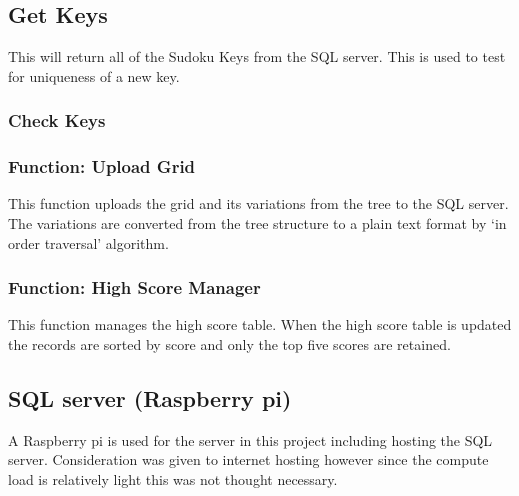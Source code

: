 \documentclass[fleqn]{article}
\begin{document}
\subsection{Get Keys}
This will return all of the Sudoku Keys from the SQL server. This is used to test for uniqueness of a new key.

\subsubsection{Check Keys}
\subsubsection*{Function: Upload Grid}

This function uploads the grid and its variations from the tree to the SQL server. The variations are converted from the tree structure to a plain text format by ‘in order traversal’ algorithm.

\subsubsection*{Function: High Score Manager}
This function manages the high score table. When the high score table is updated the records are sorted by score and only the top five scores are retained.

\subsection{SQL server (Raspberry pi)}
A Raspberry pi is used for the server in this project including hosting the SQL server. Consideration was given to internet hosting however since the compute load is relatively light this was not thought necessary.
\end{document}
